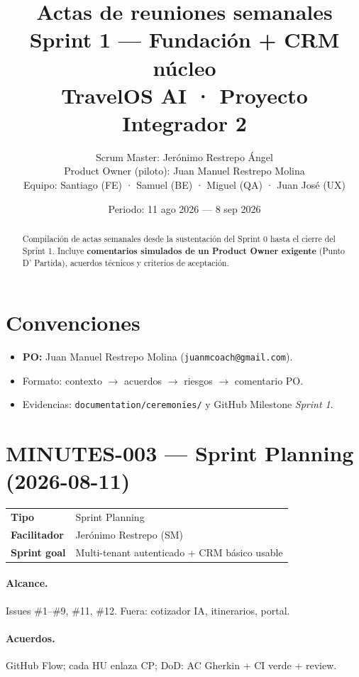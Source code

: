 \documentclass[11pt,a4paper]{article}
\title{\textbf{Actas de reuniones semanales}\\[0.3em]
\large Sprint 1 — Fundación + CRM núcleo\\[0.2em]
\normalsize TravelOS AI · Proyecto Integrador 2}
\author{Scrum Master: Jerónimo Restrepo Ángel\\
Product Owner (piloto): Juan Manuel Restrepo Molina\\
Equipo: Santiago (FE) · Samuel (BE) · Miguel (QA) · Juan José (UX)}
\date{Periodo: 11 ago 2026 — 8 sep 2026}
\begin{document}
\maketitle
\begin{abstract}
\noindent Compilación de actas semanales desde la sustentación del Sprint 0 hasta el cierre del Sprint 1.
Incluye \textbf{comentarios simulados de un Product Owner exigente} (Punto D' Partida), acuerdos técnicos y criterios de aceptación.
\end{abstract}

\section*{Convenciones}
\begin{itemize}[leftmargin=*]
  \item \textbf{PO:} Juan Manuel Restrepo Molina (\texttt{juanmcoach@gmail.com}).
  \item Formato: contexto $\rightarrow$ acuerdos $\rightarrow$ riesgos $\rightarrow$ comentario PO.
  \item Evidencias: \texttt{documentation/ceremonies/} y GitHub Milestone \emph{Sprint 1}.
\end{itemize}

\section{MINUTES-003 — Sprint Planning (2026-08-11)}
\begin{tabular}{@{}ll@{}}
\textbf{Tipo} & Sprint Planning \\
\textbf{Facilitador} & Jerónimo Restrepo (SM) \\
\textbf{Sprint goal} & Multi-tenant autenticado + CRM básico usable \\
\end{tabular}

\paragraph{Alcance.} Issues \#1--\#9, \#11, \#12. Fuera: cotizador IA, itinerarios, portal.

\paragraph{Acuerdos.} GitHub Flow; cada HU enlaza CP; DoD: AC Gherkin + CI verde + review.
\end{document}
